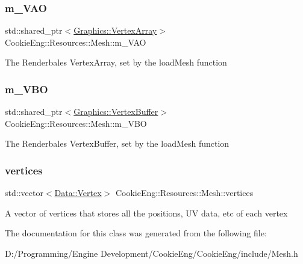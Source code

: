 \subsubsection{\texorpdfstring{m\+\_\+\+V\+AO}{m\_VAO}}
{\footnotesize\ttfamily std\+::shared\+\_\+ptr$<$\hyperlink{class_cookie_eng_1_1_graphics_1_1_vertex_array}{Graphics\+::\+Vertex\+Array}$>$ Cookie\+Eng\+::\+Resources\+::\+Mesh\+::m\+\_\+\+V\+AO\hspace{0.3cm}{\ttfamily [protected]}}

The Renderbales Vertex\+Array, set by the load\+Mesh function \mbox{\label{struct_cookie_eng_1_1_resources_1_1_mesh_a3420e235a3449e5d8f15378b410d89bd}} 
\subsubsection{\texorpdfstring{m\+\_\+\+V\+BO}{m\_VBO}}
{\footnotesize\ttfamily std\+::shared\+\_\+ptr$<$\hyperlink{class_cookie_eng_1_1_graphics_1_1_vertex_buffer}{Graphics\+::\+Vertex\+Buffer}$>$ Cookie\+Eng\+::\+Resources\+::\+Mesh\+::m\+\_\+\+V\+BO\hspace{0.3cm}{\ttfamily [protected]}}

The Renderbales Vertex\+Buffer, set by the load\+Mesh function \mbox{\label{struct_cookie_eng_1_1_resources_1_1_mesh_aa2d9365b3bb9855de51053a1bbde84a1}} 
\subsubsection{\texorpdfstring{vertices}{vertices}}
{\footnotesize\ttfamily std\+::vector$<$\hyperlink{struct_cookie_eng_1_1_data_1_1_vertex}{Data\+::\+Vertex}$>$ Cookie\+Eng\+::\+Resources\+::\+Mesh\+::vertices}

A vector of vertices that stores all the positions, UV data, etc of each vertex 

The documentation for this class was generated from the following file\+:\begin{DoxyCompactItemize}
\item 
D\+:/\+Programming/\+Engine Development/\+Cookie\+Eng/\+Cookie\+Eng/include/Mesh.\+h\end{DoxyCompactItemize}
